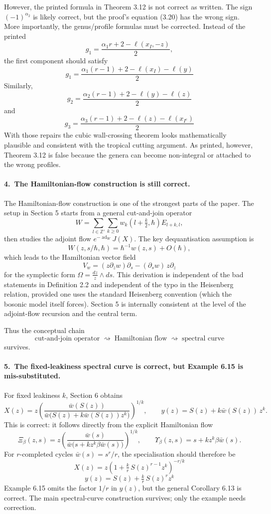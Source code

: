 \documentclass[11pt]{article}
\newcommand{\Z}{\mathbb{Z}}
\newcommand{\ellp}{\ell}
\begin{document}
However, the printed formula in Theorem 3.12 is not correct as written.  The sign $(-1)^{\alpha_2}$ is likely correct, but the proof's equation (3.20) has the wrong sign.  More importantly, the genus/profile formulas must be corrected.  Instead of the printed
\[
   g_1 = \frac{\alpha_1 r + 2 - \ellp(x_I,-z)}{2},
\]
the first component should satisfy
\[
   \boxed{\;g_1 = \frac{\alpha_1(r-1) + 2 - \ellp(x_I) - \ellp(y)}{2}\;}
\]
Similarly,
\[
   \boxed{\;g_2 = \frac{\alpha_2(r-1) + 2 - \ellp(y) - \ellp(z)}{2}\;}
\]
and
\[
   \boxed{\;g_3 = \frac{\alpha_3(r-1) + 2 - \ellp(z) - \ellp(x_{I^c})}{2}\;}
\]
With those repairs the cubic wall-crossing theorem looks mathematically plausible and consistent with the tropical cutting argument.  As printed, however, Theorem 3.12 is false because the genera can become non-integral or attached to the wrong profiles.

\paragraph{4.\ The Hamiltonian-flow construction is still correct.}
The Hamiltonian-flow construction is one of the strongest parts of the paper.  The setup in Section 5 starts from a general cut-and-join operator
\[
   W = \sum_{l\in\Z'}\sum_{k\ge 0} w_k\!\left(l+\tfrac{k}{2},\hbar\right) E_{l+k,l},
\]
then studies the adjoint flow $e^{-\operatorname{ad}_W} J(X)$.  The key dequantisation assumption is
\[
   W(z,s/\hbar,\hbar) = \hbar^{-1} w(z,s) + O(\hbar),
\]
which leads to the Hamiltonian vector field
\[
   V_w = (z\partial_z w)\partial_s - (\partial_s w)\,z\partial_z
\]
for the symplectic form $\Omega = \frac{dz}{z}\wedge ds$.  This derivation is independent of the bad statements in Definition 2.2 and independent of the typo in the Heisenberg relation, provided one uses the standard Heisenberg convention (which the bosonic model itself forces).  Section 5 is internally consistent at the level of the adjoint-flow recursion and the central term.

Thus the conceptual chain
\[
   \text{cut-and-join operator} \;\rightsquigarrow\; \text{Hamiltonian flow} \;\rightsquigarrow\; \text{spectral curve}
\]
survives.

\paragraph{5.\ The fixed-leakiness spectral curve is correct, but Example 6.15 is mis-substituted.}
For fixed leakiness $k$, Section 6 obtains
\[
   X(z) = z\left(\frac{\bar w(S(z))}{\bar w\bigl(S(z) + k\bar w(S(z))z^k\bigr)}\right)^{1/k},
   \qquad
   y(z) = S(z) + k\bar w(S(z))\,z^k.
\]
This is correct: it follows directly from the explicit Hamiltonian flow
\[
   \Xi_\beta(z,s) = z\left(\frac{\bar w(s)}{\bar w\bigl(s + kz^k\beta\bar w(s)\bigr)}\right)^{1/k},
   \qquad
   \Upsilon_\beta(z,s) = s + kz^k\beta\bar w(s).
\]
For $r$-completed cycles $\bar w(s)=s^r/r$, the specialisation should therefore be
\[
   \boxed{\;X(z) = z\left(1 + \tfrac{k}{r}\,S(z)^{r-1} z^k\right)^{-r/k}\;}
\]
\[
   \boxed{\;y(z) = S(z) + \tfrac{k}{r}\,S(z)^r z^k\;}
\]
Example 6.15 omits the factor $1/r$ in $y(z)$, but the general Corollary 6.13 is correct.  The main spectral-curve construction survives; only the example needs correction.
\end{document}
